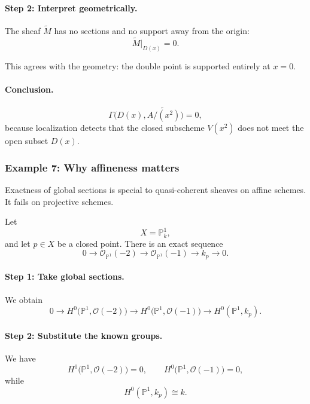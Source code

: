 \documentclass[12pt,a4paper]{article}
\theoremstyle{notespace}
\begin{document}
\paragraph{Step 2: Interpret geometrically.}

The sheaf \(\widetilde{M}\) has no sections and no support away from the
origin:
\[
\widetilde{M}|_{D(x)}=0.
\]

This agrees with the geometry: the double point is supported entirely at
\(x=0\).

\paragraph{Conclusion.}

\[
\boxed{
	\Gamma\bigl(D(x),\widetilde{A/(x^{2})}\bigr)=0,
}
\]
because localization detects that the closed subscheme \(V(x^{2})\) does not
meet the open subset \(D(x)\).

\subsubsection{Example 7: Why affineness matters}

Exactness of global sections is special to quasi-coherent sheaves on affine
schemes. It fails on projective schemes.

Let
\[
X=\mathbb{P}^{1}_{k},
\]
and let \(p\in X\) be a closed point. There is an exact sequence
\[
0
\longrightarrow
\mathcal{O}_{\mathbb{P}^{1}}(-2)
\longrightarrow
\mathcal{O}_{\mathbb{P}^{1}}(-1)
\longrightarrow
k_{p}
\longrightarrow
0.
\]

\paragraph{Step 1: Take global sections.}

We obtain
\[
0
\longrightarrow
H^{0}\bigl(\mathbb{P}^{1},\mathcal{O}(-2)\bigr)
\longrightarrow
H^{0}\bigl(\mathbb{P}^{1},\mathcal{O}(-1)\bigr)
\longrightarrow
H^{0}(\mathbb{P}^{1},k_{p}).
\]

\paragraph{Step 2: Substitute the known groups.}

We have
\[
H^{0}\bigl(\mathbb{P}^{1},\mathcal{O}(-2)\bigr)=0,
\qquad
H^{0}\bigl(\mathbb{P}^{1},\mathcal{O}(-1)\bigr)=0,
\]
while
\[
H^{0}(\mathbb{P}^{1},k_{p})\cong k.
\]
\end{document}

